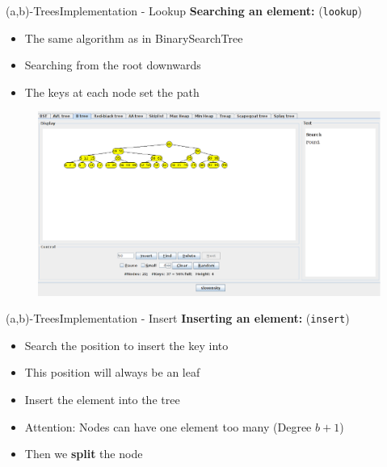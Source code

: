 \begin{frame}{(a,b)-Trees}{Implementation - Lookup}
  \textbf{Searching an element:} (\texttt{\color{Mittel-Blau}lookup})
  \begin{itemize}
    \item<2->
      The same algorithm as in {\color{Mittel-Blau}BinarySearchTree}
    \item<3->
      Searching from the root downwards
    \item<4->
      The keys at each node set the path
  \end{itemize}
  \begin{figure}
    \includegraphics[width=1\textwidth]{Images/(a,b)-Tree/25.pdf}
  \end{figure}
\end{frame}


\begin{frame}{(a,b)-Trees}{Implementation - Insert}
  \textbf{Inserting an element:} (\texttt{\color{Mittel-Blau}insert})
  \begin{itemize}
    \item<2->
      Search the position to insert the key into
    \item<3->
      This position will always be an leaf
    \item<4->
      Insert the element into the tree
    \item<5->
      {\color{cyan}Attention:} Nodes can have one element too many (Degree {\color{Mittel-Blau}$b+1$})
    \item<6-> Then we \textbf{split} the node
  \end{itemize}
\end{frame}


